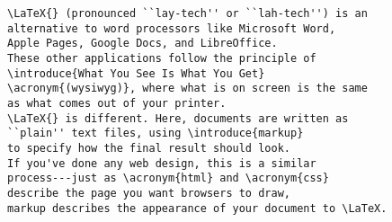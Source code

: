 \begin{samepage}
\begin{leftfigure}
\begin{lstlisting}
\LaTeX{} (pronounced ``lay-tech'' or ``lah-tech'') is an
alternative to word processors like Microsoft Word,
Apple Pages, Google Docs, and LibreOffice.
These other applications follow the principle of
\introduce{What You See Is What You Get}
\acronym{(wysiwyg)}, where what is on screen is the same
as what comes out of your printer.
\LaTeX{} is different. Here, documents are written as
``plain'' text files, using \introduce{markup}
to specify how the final result should look.
If you've done any web design, this is a similar
process---just as \acronym{html} and \acronym{css}
describe the page you want browsers to draw,
markup describes the appearance of your document to \LaTeX.
\end{lstlisting}
\end{leftfigure}
\end{samepage}

